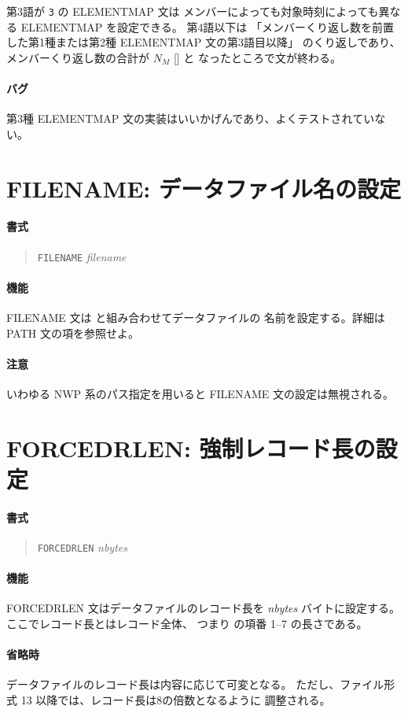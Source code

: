 第3語が {\tt 3} の ELEMENTMAP 文は
メンバーによっても対象時刻によっても異なる ELEMENTMAP を設定できる。
第4語以下は
「メンバーくり返し数を前置した第1種または第2種 ELEMENTMAP 文の第3語目以降」
のくり返しであり、
メンバーくり返し数の合計が $N_M$ [] と
なったところで文が終わる。
\paragraph{バグ}
第3種 ELEMENTMAP 文の実装はいいかげんであり、よくテストされていない。

\section{FILENAME: データファイル名の設定}
\label{sec:def:FILENAME}
\paragraph{書式}
\begin{quote}
{\tt FILENAME} {\it filename}
\end{quote}
\paragraph{機能}
FILENAME 文は  と組み合わせてデータファイルの
名前を設定する。詳細は PATH 文の項を参照せよ。
\paragraph{注意}
いわゆる NWP 系のパス指定を用いると FILENAME 文の設定は無視される。

\section{FORCEDRLEN: 強制レコード長の設定}
\label{sec:def:FORCEDRLEN}
\paragraph{書式}
\begin{quote}
{\tt FORCEDRLEN} {\it nbytes}
\end{quote}
\paragraph{機能}
FORCEDRLEN 文はデータファイルのレコード長を {\it nbytes} バイトに設定する。
ここでレコード長とはレコード全体、
つまり  の項番 1--7 の長さである。
\paragraph{省略時}
データファイルのレコード長は内容に応じて可変となる。
ただし、ファイル形式 13 以降では、レコード長は8の倍数となるように
調整される。

